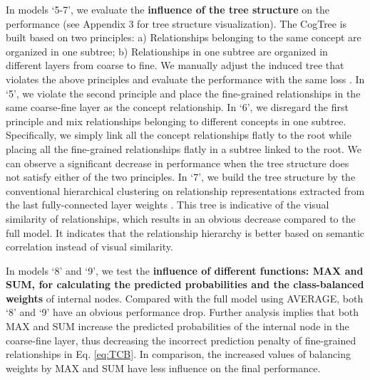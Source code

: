 \documentclass[letterpaper]{article} \usepackage{aaai21}  \usepackage{times}  \usepackage{helvet} \usepackage{courier}  \usepackage[hyphens]{url}  \usepackage{graphicx} \urlstyle{rm} \def\UrlFont{\rm}  \usepackage{natbib}  \usepackage{caption} \frenchspacing  \setlength{\pdfpagewidth}{8.5in}  \setlength{\pdfpageheight}{11in}  \usepackage{amsmath,amsthm}
\begin{document}
In models `5-7', we evaluate the \textbf{influence of the tree structure} on the performance (see Appendix 3 for tree structure visualization). The CogTree is built based on two principles: a) Relationships belonging to the same concept are organized in one subtree; b) Relationships in one subtree are organized in different layers from coarse to fine.  We manually adjust the induced tree that violates the above principles and evaluate the performance with the same loss . In `5', we violate the second principle and place the fine-grained relationships in the same coarse-fine layer as the concept relationship. In `6',  we disregard the first principle and mix relationships belonging to different concepts in one subtree. Specifically, we simply link all the concept relationships flatly to the root while placing all the fine-grained relationships flatly in a subtree linked to the root. We can observe a significant decrease in performance when the tree structure  does not satisfy either of the two principles. In `7', we build the tree structure by the conventional hierarchical clustering on relationship representations extracted from the last fully-connected layer weights \cite{wan2020nbdt}. This tree is indicative of the visual similarity of relationships, which results in an obvious decrease compared to the full model. It indicates that the relationship hierarchy is better based on semantic correlation instead of visual similarity. 

In models `8' and `9', we test the \textbf{influence of different functions: MAX and SUM, for calculating the predicted probabilities and the class-balanced weights} of internal nodes. Compared with the full model using AVERAGE, both `8' and `9' have an obvious performance drop. Further analysis implies that both MAX and SUM increase the predicted probabilities of the internal node in the coarse-fine layer, thus decreasing the 
incorrect prediction penalty  of fine-grained relationships in Eq. \ref{eq:TCB}. In comparison, the increased values of balancing weights by MAX and SUM have less influence on the final performance. 
\end{document}
